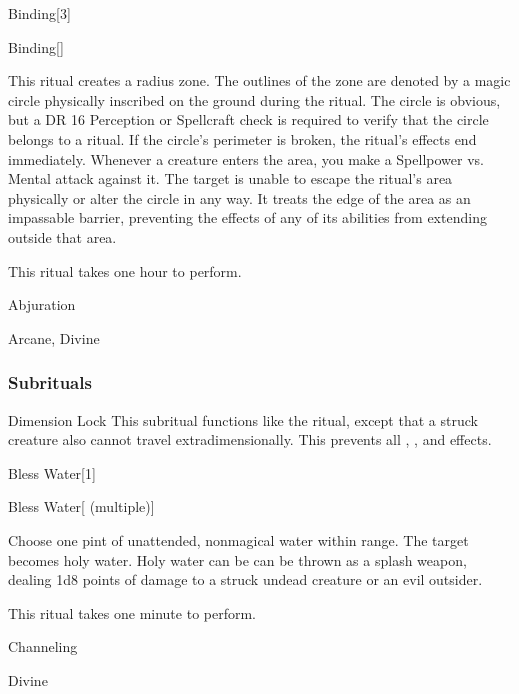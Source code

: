 \begin{spellsection}{Binding}[3]


\begin{ability}{Binding}[]

This ritual creates a \areasmall radius zone.
The outlines of the zone are denoted by a magic circle physically inscribed on the ground during the ritual.
The circle is obvious, but a DR 16 Perception or Spellcraft check is required to verify that the circle belongs to a  ritual.
If the circle's perimeter is broken, the ritual's effects end immediately.
Whenever a creature enters the area, you make a Spellpower vs. Mental attack against it.
\hit The target is unable to escape the ritual's area physically or alter the circle in any way.
It treats the edge of the area as an impassable barrier, preventing the effects of any of its abilities from extending outside that area.

This ritual takes one hour to perform.

\end{ability}




 Abjuration

 Arcane, Divine
\end{spellsection}


\subsubsection{Subrituals}


\begin{ability}[\nth{5}]{Dimension Lock}
This subritual functions like the  ritual, except that a struck creature also cannot travel extradimensionally.
This prevents all , , and  effects.
\end{ability}
\vspace{0.25em}


\begin{spellsection}{Bless Water}[1]


\begin{ability}{Bless Water}[ (multiple)]

Choose one pint of unattended, nonmagical water within \rngclose range.
The target becomes holy water.
Holy water can be can be thrown as a splash weapon, dealing 1d8 points of damage to a struck undead creature or an evil outsider.

This ritual takes one minute to perform.

\end{ability}




 Channeling

 Divine
\end{spellsection}



